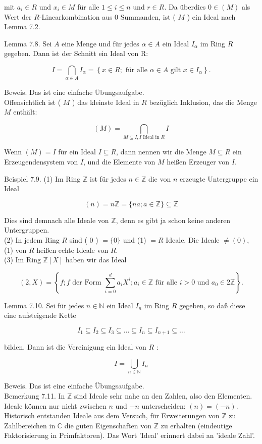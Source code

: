 \documentclass[10pt, letterpaper]{article}
\begin{document}
mit $a_{i} \in R$ und $x_{i} \in M$ für alle $1 \leq i \leq n$ und $r \in R$. Da überdies $0 \in(M)$ als Wert der $R$-Linearkombination aus 0 Summanden, ist ( $M$ ) ein Ideal nach Lemma 7.2.

Lemma 7.8. Sei $A$ eine Menge und für jedes $\alpha \in A$ ein Ideal $I_{\alpha}$ im Ring $R$ gegeben. Dann ist der Schnitt ein Ideal von R:

$$
I=\bigcap_{\alpha \in A} I_{\alpha}=\left\{x \in R ; \text { für alle } \alpha \in A \text { gilt } x \in I_{\alpha}\right\} .
$$

Beweis. Das ist eine einfache Übungsaufgabe.\\
Offensichtlich ist ( $M$ ) das kleinste Ideal in $R$ bezüglich Inklusion, das die Menge $M$ enthält:

$$
(M)=\bigcap_{M \subseteq I, I \text { Ideal in } R} I
$$

Wenn $(M)=I$ für ein Ideal $I \subseteq R$, dann nennen wir die Menge $M \subseteq R$ ein Erzeugendensystem von $I$, und die Elemente von $M$ heißen Erzeuger von $I$.

Beispiel 7.9. (1) Im Ring $\mathbb{Z}$ ist für jedes $n \in \mathbb{Z}$ die von $n$ erzeugte Untergruppe ein Ideal

$$
(n)=n \mathbb{Z}=\{n a ; a \in \mathbb{Z}\} \subseteq \mathbb{Z}
$$

Dies sind demnach alle Ideale von $\mathbb{Z}$, denn es gibt ja schon keine anderen Untergruppen.\\
(2) In jedem Ring $R$ sind ( 0 ) $=\{0\}$ und (1) $=R$ Ideale. Die Ideale $\neq(0)$, (1) von $R$ heißen echte Ideale von $R$.\\
(3) Im Ring $\mathbb{Z}[X]$ haben wir das Ideal

$$
(2, X)=\left\{f ; f \text { der Form } \sum_{i=0}^{d} a_{i} X^{i} ; a_{i} \in \mathbb{Z} \text { für alle } i>0 \text { und } a_{0} \in 2 \mathbb{Z}\right\} .
$$

Lemma 7.10. Sei für jedes $n \in \mathbb{N}$ ein Ideal $I_{n}$ im Ring $R$ gegeben, so daß diese eine aufsteigende Kette

$$
I_{1} \subseteq I_{2} \subseteq I_{3} \subseteq \ldots \subseteq I_{n} \subseteq I_{n+1} \subseteq \ldots
$$

bilden. Dann ist die Vereinigung ein Ideal von $R$ :

$$
I=\bigcup_{n \in \mathbb{N}} I_{n}
$$

Beweis. Das ist eine einfache Übungsaufgabe.\\
Bemerkung 7.11. In $\mathbb{Z}$ sind Ideale sehr nahe an den Zahlen, also den Elementen. Ideale können nur nicht zwischen $n$ und $-n$ unterscheiden: $(n)=(-n)$. Historisch entstanden Ideale aus dem Versuch, für Erweiterungen von $\mathbb{Z}$ zu Zahlbereichen in $\mathbb{C}$ die guten Eigenschaften von $\mathbb{Z}$ zu erhalten (eindeutige Faktorisierung in Primfaktoren). Das Wort 'Ideal' erinnert dabei an 'ideale Zahl'.
\end{document}
